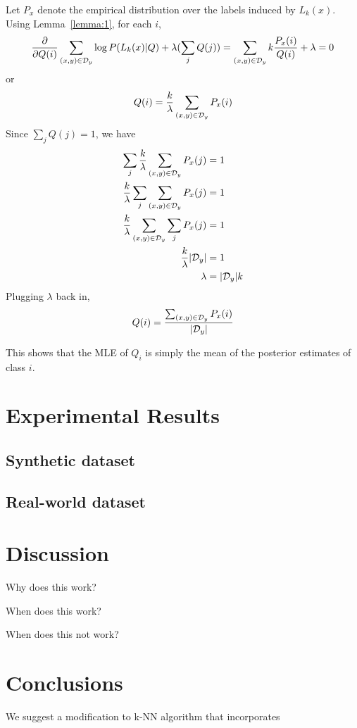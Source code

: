 \documentclass{article}
\begin{document}
Let $P_x$ denote the empirical distribution over the labels induced by
$L_k(x)$. Using Lemma~\ref{lemma:1}, for each $i$,
\[
\frac{\partial}{\partial Q(i)} \sum_{(x,y) \in \mathcal{D}_y} \log P(L_k(x)|Q) + \lambda
(\sum_{j} Q(j)) = \sum_{(x,y) \in \mathcal{D}_y} k \frac{P_x(i)}{Q(i)} + \lambda = 0
\]
or
\[
Q(i) = \frac{k}{\lambda} \sum_{(x,y) \in \mathcal{D}_y} P_x(i)
\]
Since $\sum_{j} Q(j) = 1$, we have
\begin{align*}
\sum_{j} \frac{k}{\lambda} \sum_{(x,y) \in \mathcal{D}_y} P_x(j) &= 1\\
\frac{k}{\lambda} \sum_{j} \sum_{(x,y) \in \mathcal{D}_y} P_x(j) &= 1\\
\frac{k}{\lambda} \sum_{(x,y) \in \mathcal{D}_y} \sum_{j} P_x(j) &= 1\\
\frac{k}{\lambda} |\mathcal{D}_y| &= 1\\
\lambda &= |\mathcal{D}_y|k\\
\end{align*}
Plugging $\lambda$ back in,
\[
Q(i) = \frac{\sum_{(x,y) \in \mathcal{D}_y} P_x(i)}{|\mathcal{D}_y|}
\]

This shows that the MLE of $Q_i$ is simply the mean of the posterior
estimates of class $i$.


\section{Experimental Results}

\subsection{Synthetic dataset}

\subsection{Real-world dataset}

\section{Discussion}

Why does this work?

When does this work?

When does this not work?


\section{Conclusions}

We suggest a modification to k-NN algorithm that incorporates 




\end{document}
